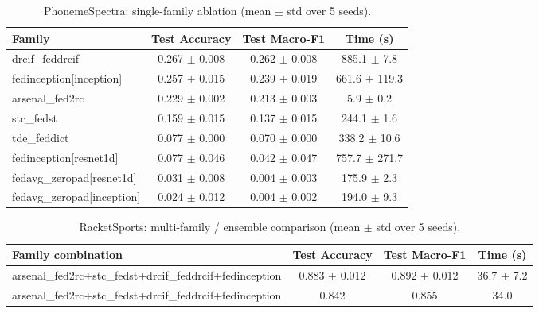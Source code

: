 \begin{table}[t]
\centering
\caption{PhonemeSpectra: single-family ablation (mean $\pm$ std over 5 seeds).}
\label{tab:results_phonemespectra_ablation}
\begin{tabular}{lccc}
\toprule
Family & Test Accuracy & Test Macro-F1 & Time (s) \\
\midrule
drcif\_feddrcif & 0.267 $\pm$ 0.008 & 0.262 $\pm$ 0.008 & 885.1 $\pm$ 7.8 \\
fedinception[inception] & 0.257 $\pm$ 0.015 & 0.239 $\pm$ 0.019 & 661.6 $\pm$ 119.3 \\
arsenal\_fed2rc & 0.229 $\pm$ 0.002 & 0.213 $\pm$ 0.003 & 5.9 $\pm$ 0.2 \\
stc\_fedst & 0.159 $\pm$ 0.015 & 0.137 $\pm$ 0.015 & 244.1 $\pm$ 1.6 \\
tde\_feddict & 0.077 $\pm$ 0.000 & 0.070 $\pm$ 0.000 & 338.2 $\pm$ 10.6 \\
fedinception[resnet1d] & 0.077 $\pm$ 0.046 & 0.042 $\pm$ 0.047 & 757.7 $\pm$ 271.7 \\
fedavg\_zeropad[resnet1d] & 0.031 $\pm$ 0.008 & 0.004 $\pm$ 0.003 & 175.9 $\pm$ 2.3 \\
fedavg\_zeropad[inception] & 0.024 $\pm$ 0.012 & 0.004 $\pm$ 0.002 & 194.0 $\pm$ 9.3 \\
\bottomrule
\end{tabular}
\end{table}

\begin{table}[t]
\centering
\caption{RacketSports: multi-family / ensemble comparison (mean $\pm$ std over 5 seeds).}
\label{tab:results_racketsports_ensemble}
\begin{tabular}{lccc}
\toprule
Family combination & Test Accuracy & Test Macro-F1 & Time (s) \\
\midrule
arsenal\_fed2rc+stc\_fedst+drcif\_feddrcif+fedinception & 0.883 $\pm$ 0.012 & 0.892 $\pm$ 0.012 & 36.7 $\pm$ 7.2 \\
arsenal\_fed2rc+stc\_fedst+drcif\_feddrcif+fedinception & 0.842 & 0.855 & 34.0 \\
\bottomrule
\end{tabular}
\end{table}

